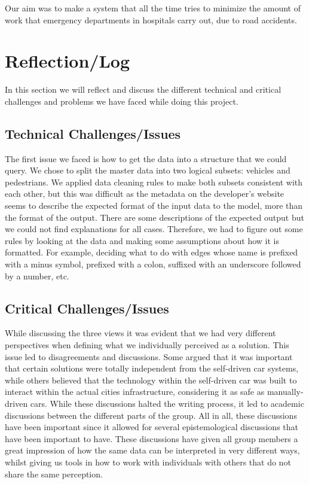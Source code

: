 \documentclass[format=acmsmall, review=false, screen=true]{acmart}
\begin{document}
Our aim was to make a system that all the time tries to minimize the amount of work that emergency departments in hospitals carry out, due to road accidents.

\section{Reflection/Log}

In this section we will reflect and discuss the different technical and critical challenges and problems we have faced while doing this project.

\subsection{Technical Challenges/Issues}

The first issue we faced is how to get the data into a structure that we could query. We chose to split the master data into two logical subsets: vehicles and pedestrians. We applied data cleaning rules to make both subsets consistent with each other, but this was difficult as the metadata on the developer’s website seems to describe the expected format of the input data to the model, more than the format of the output. There are some descriptions of the expected output but we could not find explanations for all cases. Therefore, we had to figure out some rules by looking at the data and making some assumptions about how it is formatted. For example, deciding what to do with edges whose name is prefixed with a minus symbol, prefixed with a colon, suffixed with an underscore followed by a number, etc.


\subsection{Critical Challenges/Issues}

While discussing the three views it was evident that we had very different perspectives when defining what we individually perceived as a solution. This issue led to disagreements and discussions. Some argued that it was important that certain solutions were totally independent from the self-driven car systems, while others believed that the technology within the self-driven car was built to interact within the actual cities infrastructure, considering it as safe as manually-driven cars. While these discussions halted the writing process, it led to academic discussions between the different parts of the group. All in all, these discussions have been important since it allowed for several epistemological discussions that have been important to have. These discussions have given all group members a great impression of how the same data can be interpreted in very different ways, whilst giving us tools in how to work with individuals with others that do not share the same perception.
\end{document}
